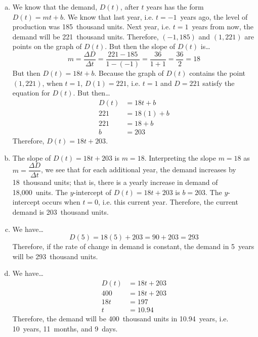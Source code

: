 \documentclass[11pt,letterpaper]{article}
\begin{document}
\sol 
\begin{enumerate}[(a)]
\item We know that the demand, $D(t)$, after $t$ years has the form $D(t)= mt + b$. We know that last year, i.e. $t= -1$~years ago, the level of production was 185~thousand units. Next year, i.e. $t= 1$~years from now, the demand will be 221~thousand units. Therefore, $(-1, 185)$ and $(1, 221)$ are points on the graph of $D(t)$. But then the slope of $D(t)$ is\dots
	\[
	m= \dfrac{\Delta D}{\Delta t}= \dfrac{221 - 185}{1 - (-1)}= \dfrac{36}{1 + 1}= \dfrac{36}{2}= 18
	\]
But then $D(t)= 18t + b$. Because the graph of $D(t)$ contains the point $(1, 221)$, when $t= 1$, $D(1)= 221$, i.e. $t= 1$ and $D= 221$ satisfy the equation for $D(t)$. But then\dots
	\[
	\begin{aligned}
	D(t)&= 18t + b \\[0.3cm]
	221&= 18(1) + b \\[0.3cm]
	221&= 18 + b \\[0.3cm]
	b&= 203
	\end{aligned}
	\]
Therefore, $D(t)= 18t + 203$. \pspace

\item The slope of $D(t)= 18t + 203$ is $m= 18$. Interpreting the slope $m= 18$ as $m= \dfrac{\Delta D}{\Delta t}$, we see that for each additional year, the demand increases by 18~thousand units; that is, there is a yearly increase in demand of 18,000~units. The $y$-intercept of $D(t)= 18t + 203$ is $b= 203$. The $y$-intercept occurs when $t= 0$, i.e. this current year. Therefore, the current demand is 203~thousand units. \pspace

\item We have\dots
	\[
	D(5)= 18(5) + 203= 90 + 203= 293
	\]
Therefore, if the rate of change in demand is constant, the demand in 5~years will be 293~thousand units. \pspace

\item We have\dots
	\[
	\begin{aligned}
	D(t)&= 18t + 203 \\[0.3cm]
	400&= 18t + 203 \\[0.3cm]
	18t&= 197 \\[0.3cm]
	t&= 10.94
	\end{aligned}
	\]
Therefore, the demand will be 400~thousand units in 10.94~years, i.e. 10~years, 11~months, and 9~days. 
\end{enumerate}
\end{document}

